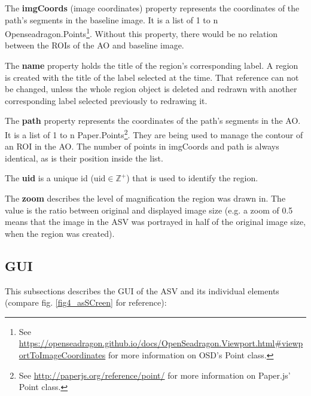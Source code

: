 The \textbf{imgCoords} (image coordinates) property represents the coordinates of the path's segments in the baseline image. It is a list of 1 to n Openseadragon.Points\footnote{
	See \url{https://openseadragon.github.io/docs/OpenSeadragon.Viewport.html\#viewportToImageCoordinates} for more information on OSD's Point class.
}.
Without this property, there would be no relation between the ROIs of the AO and baseline image.

The \textbf{name} property holds the title of the region's corresponding label. A region is created with the title of the label selected at the time. That reference can not be changed, unless the whole region object is deleted and redrawn with another corresponding label selected previously to redrawing it.

The \textbf{path} property represents the coordinates of the path's segments in the AO. It is a list of 1 to n Paper.Points\footnote{
	See \url{http://paperjs.org/reference/point/} for more information on Paper.js' Point class.
}. They are being used to manage the contour of an ROI in the AO. The number of points in imgCoords and path is always identical, as is their position inside the list.

The \textbf{uid} is a unique id ($\text{uid} \in \mathbb{Z}^{+}$) that is used to identify the region.

The \textbf{zoom} describes the level of magnification the region was drawn in. The value is the ratio between original and displayed image size (e.g. a zoom of 0.5 means that the image in the ASV was portrayed in half of the original image size, when the region was created)\cite{web:openseadragon}.


\subsection{GUI}
This subsections describes the GUI of the ASV and its individual elements (compare fig. \ref{fig4_asSCreen} for reference):

